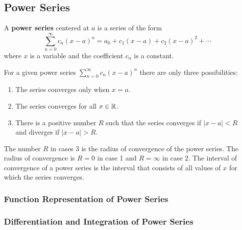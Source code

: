 \subsection{Power Series}
A \textbf{power series} centered at \(a\) is a series of the form
\[\sum_{n=0}^{\infty}c_n(x-a)^n=a_0+c_1(x-a)+c_2(x-a)^2+\cdots\]
where \(x\) is a variable and the coefficient \(c_n\) is a constant.
\begin{theorem}
    For a given power series \(\sum_{n=0}^\infty c_n(x-a)^n\) there are only
    three possibilities:
    \begin{enumerate}
        \item The series converges only when \(x=a\).
        \item The series converges for all \(x\in\mathbb{R}\).
        \item There is a positive number \(R\) such that the series converges
        if \(|x-a|<R\) and diverges if \(|x-a|>R\).
    \end{enumerate}
\end{theorem}
The number \(R\) in cases 3 is the radius of convergence of the power series.
The radius of convergence is \(R=0\) in case 1 and \(R=\infty\) in case 2.
The interval of convergence of a power series is the interval that consists of
all values of \(x\) for which the series converges.

\subsubsection*{Function Representation of Power Series}

\subsubsection*{Differentiation and Integration of Power Series}